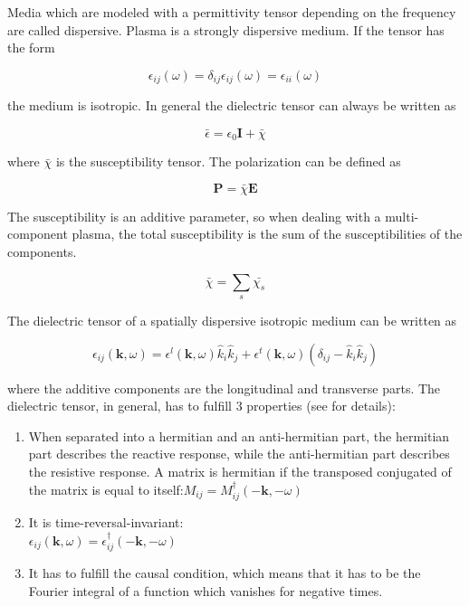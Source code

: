 \documentclass[draft,ras]{agutex}
\begin{document}
\begin{article}
Media which are modeled with a permittivity tensor depending on the frequency are called dispersive. Plasma is a strongly dispersive medium. If the tensor has the form

\begin{equation}
    \epsilon_{ij}(\omega)=\delta_{ij} \epsilon_{ij}(\omega)=\epsilon_{ii}(\omega)
\end{equation}

the medium is isotropic. In general the dielectric tensor can always be written as

\begin{equation}
    \bar{\epsilon}=\epsilon_0\mathbf{I}+\bar{\chi}
\end{equation}

where $\bar{\chi}$ is the susceptibility tensor. The polarization can be defined as

\begin{equation}
    \mathbf{P}=\bar{\chi} \mathbf{E}
\end{equation}

The susceptibility is an additive parameter, so when dealing with a multi-component plasma, the total susceptibility is the sum of the susceptibilities of the components.

\begin{equation}
    \bar{\chi}=\sum_s \bar{\chi_s}
\end{equation}


The dielectric tensor of a spatially dispersive isotropic medium can be written as

\begin{equation}
   \epsilon_{ij}(\mathbf{k},\omega)=\epsilon^l(\mathbf{k},\omega)\hat{k}_i \hat{k}_j+\epsilon^t(\mathbf{k},\omega)(\delta_{ij}-\hat{k}_i \hat{k}_j)
\end{equation}

where the additive components are the longitudinal and transverse parts. The dielectric tensor, in general, has to fulfill 3 properties (see \cite{melrose1} for details):\\

\begin{enumerate}
    \item When separated into a hermitian and an anti-hermitian part, the hermitian part describes the reactive response, while the anti-hermitian part describes the resistive response. A matrix is hermitian if the transposed conjugated of the matrix is equal to itself:$M_{ij}=M_{ij}^\dagger (-\mathbf{k},-\omega)$\\
\item It is time-reversal-invariant:\\ $\epsilon_{ij}(\mathbf{k},\omega)=\epsilon_{ij}^\dagger (-\mathbf{k},-\omega)$\\
\item It has to fulfill the causal condition, which means that it has to be the Fourier integral of a function which vanishes for negative times.\\
\end{enumerate}


\end{article}
\end{document}
